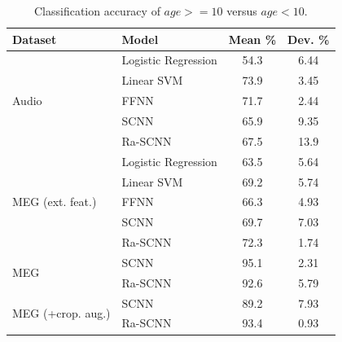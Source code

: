\documentclass[fleqn,10pt]{wlscirep}
\begin{document}
\begin{table}[htp]
  \caption{Classification accuracy of $age >= 10$ versus $age < 10$.}
  \centering
  \begin{tabular}{l l | c | c}
    \toprule
    \textbf{Dataset} & \textbf{Model} & \textbf{Mean \%} & \textbf{Dev. \%} \\
    \toprule
    \multirow{5}{*}{Audio}
                         & Logistic Regression    & 54.3 & 6.44  \\
                         & Linear SVM             & 73.9 & 3.45  \\
                         & FFNN                   & 71.7 & 2.44  \\
                         & SCNN                   & 65.9 & 9.35  \\
                         & Ra-SCNN                & 67.5 & 13.9  \\
    \midrule
    \multirow{5}{*}{MEG (ext. feat.)}
                         & Logistic Regression    & 63.5 & 5.64  \\
                         & Linear SVM             & 69.2 & 5.74  \\
                         & FFNN                   & 66.3 & 4.93  \\
                         & SCNN                   & 69.7 & 7.03  \\
                         & Ra-SCNN                & 72.3 & 1.74  \\    
    \midrule
    \multirow{2}{*}{MEG}
                         & SCNN                & 95.1 & 2.31  \\
                         & Ra-SCNN             & 92.6 & 5.79  \\     
    \midrule
    \multirow{2}{*}{MEG (+crop. aug.)}
                         & SCNN                & 89.2 & 7.93  \\
                         & Ra-SCNN             & 93.4 & 0.93  \\         
    \bottomrule
  \end{tabular}
  \label{tab:binary_results}
\end{table}
\end{document}
